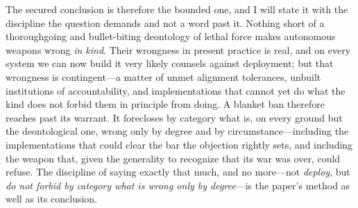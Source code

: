 \documentclass[11pt]{article}
\begin{document}
The secured conclusion is therefore the bounded one, and I will state it with the discipline the question demands and not a word past it. Nothing short of a thoroughgoing and bullet-biting deontology of lethal force makes autonomous weapons wrong \emph{in kind}. Their wrongness in present practice is real, and on every system we can now build it very likely counsels against deployment; but that wrongness is contingent---a matter of unmet alignment tolerances, unbuilt institutions of accountability, and implementations that cannot yet do what the kind does not forbid them in principle from doing. A blanket ban therefore reaches past its warrant. It forecloses by category what is, on every ground but the deontological one, wrong only by degree and by circumstance---including the implementations that could clear the bar the objection rightly sets, and including the weapon that, given the generality to recognize that its war was over, could refuse. The discipline of saying exactly that much, and no more---not \emph{deploy}, but \emph{do not forbid by category what is wrong only by degree}---is the paper's method as well as its conclusion.
\end{document}

